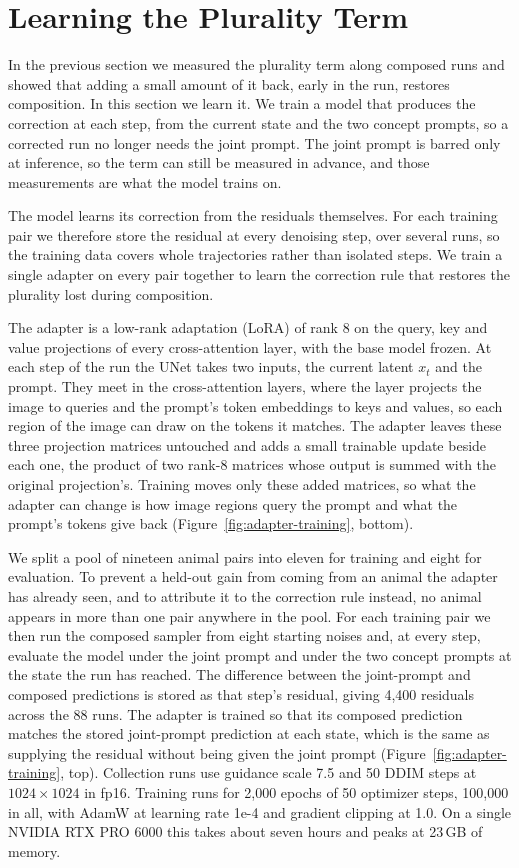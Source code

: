 \documentclass{article} %
\begin{document}
\section{Learning the Plurality Term}
\label{sec:method}
In the previous section we measured the plurality term along composed runs and showed that adding a small amount of it back, early in the run, restores composition. In this section we learn it. We train a model that produces the correction at each step, from the current state and the two concept prompts, so a corrected run no longer needs the joint prompt. The joint prompt is barred only at inference, so the term can still be measured in advance, and those measurements are what the model trains on.

The model learns its correction from the residuals themselves. For each training pair we therefore store the residual at every denoising step, over several runs, so the training data covers whole trajectories rather than isolated steps. We train a single adapter on every pair together to learn the correction rule that restores the plurality lost during composition.

The adapter is a low-rank adaptation (LoRA) of rank 8 on the query, key and value projections of every cross-attention layer, with the base model frozen. At each step of the run the UNet takes two inputs, the current latent $x_t$ and the prompt. They meet in the cross-attention layers, where the layer projects the image to queries and the prompt's token embeddings to keys and values, so each region of the image can draw on the tokens it matches. The adapter leaves these three projection matrices untouched and adds a small trainable update beside each one, the product of two rank-8 matrices whose output is summed with the original projection's. Training moves only these added matrices, so what the adapter can change is how image regions query the prompt and what the prompt's tokens give back (Figure~\ref{fig:adapter-training}, bottom).

We split a pool of nineteen animal pairs into eleven for training and eight for evaluation. To prevent a held-out gain from coming from an animal the adapter has already seen, and to attribute it to the correction rule instead, no animal appears in more than one pair anywhere in the pool. For each training pair we then run the composed sampler from eight starting noises and, at every step, evaluate the model under the joint prompt and under the two concept prompts at the state the run has reached. The difference between the joint-prompt and composed predictions is stored as that step's residual, giving 4,400 residuals across the 88 runs. The adapter is trained so that its composed prediction matches the stored joint-prompt prediction at each state, which is the same as supplying the residual without being given the joint prompt (Figure~\ref{fig:adapter-training}, top). Collection runs use guidance scale 7.5 and 50 DDIM steps at $1024\times1024$ in fp16. Training runs for 2,000 epochs of 50 optimizer steps, 100,000 in all, with AdamW at learning rate 1e-4 and gradient clipping at 1.0. On a single NVIDIA RTX PRO 6000 this takes about seven hours and peaks at 23\,GB of memory.
\end{document}
